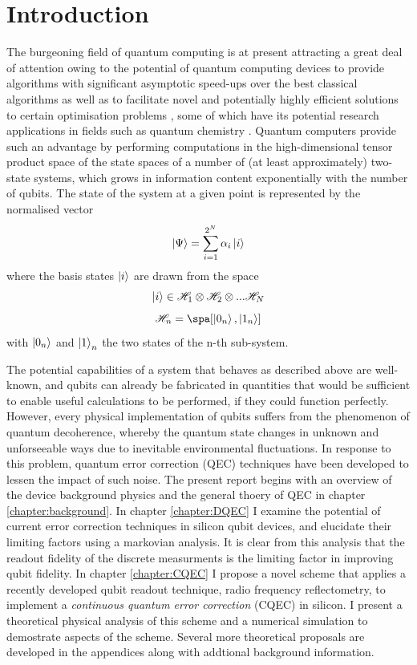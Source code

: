 \documentclass{report}
\begin{document}
\chapter{Introduction}
The burgeoning field of quantum computing is at present attracting a great deal of attention owing to the potential of quantum computing devices to provide algorithms with significant asymptotic speed-ups over the best classical algorithms \cite{shor_1997} as well as to facilitate novel and potentially highly efficient solutions to certain optimisation problems \cite{tilly_2022}, some of which have its potential research applications in fields such as quantum chemistry \cite{cao_2019}. Quantum computers provide such an advantage by performing computations in the high-dimensional tensor product space of the state spaces of a number of (at least approximately) two-state systems, which grows in information content exponentially with the number of qubits. The state of the system at a given point is represented by the normalised vector 
\begin{equation*}
    \ket{\Psi} = \sum_{i = 1}^{2^N}{\alpha_i \ket{i}}
\end{equation*}
where the basis states $\ket{i}$ are drawn from the space
\begin{equation*}
    \ket{i} \in \mathscr{H}_1 \otimes \mathscr{H}_2 \otimes ... \mathscr{H}_N
\end{equation*}
\begin{equation*}
    \mathscr{H}_n = \spa[\ket{0_n},\ket{1_n}]
\end{equation*} with $\ket{0_n}$ and $\ket{1}_n$ the two states of the n-th sub-system.

The potential capabilities of a system that behaves as described above are well-known, and qubits can already be fabricated in quantities that would be sufficient to enable useful calculations to be performed, if they could function perfectly. However, every physical implementation of qubits suffers from the phenomenon of quantum decoherence, whereby the quantum state changes in unknown and unforseeable ways due to inevitable environmental fluctuations. In response to this problem, quantum error correction (QEC) techniques have been developed to lessen the impact of such noise. The present report begins with an overview of the device background physics and the general thoery of QEC in chapter \ref{chapter:background}. In chapter \ref{chapter:DQEC} I examine the potential of current error correction techniques in silicon qubit devices, and elucidate their limiting factors using a markovian analysis. It is clear from this analysis that the readout fidelity of the discrete measurments is the limiting factor in improving qubit fidelity. In chapter \ref{chapter:CQEC} I propose a novel scheme that applies a recently developed qubit readout technique, radio frequency reflectometry, to implement a \textit{continuous quantum error correction} (CQEC) in silicon. I present a theoretical physical analysis of this scheme and a numerical simulation to demostrate aspects of the scheme. Several more theoretical proposals are developed in the appendices along with addtional background information.
\end{document}
